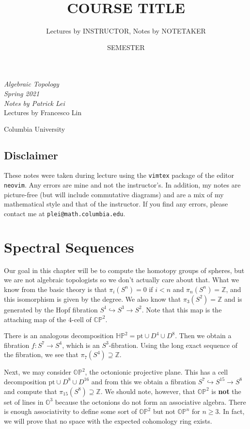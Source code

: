 \documentclass[leqno, openany]{memoir}
\title{COURSE TITLE}
\author{Lectures by INSTRUCTOR, Notes by NOTETAKER}
\date{SEMESTER}
\theoremstyle{definition}
\theoremstyle{remark}
\theoremstyle{plain}
\theoremstyle{definition}
\theoremstyle{remark}
\renewcommand{\H}{\mathbb{H}}
\newcommand{\C}{\mathbb{C}}
\newcommand{\Z}{\mathbb{Z}}
\renewcommand{\P}{\mathbb{P}}
\newcommand{\mr}[1]{\mathrm{#1}}
\newcommand*{\titleSW}
    {\begingroup%
    \raggedleft
    \vspace*{\baselineskip}
    {\Huge\itshape Algebraic Topology \\ Spring 2021}\\[\baselineskip]
    {\large\itshape Notes by Patrick Lei}\\[0.2\textheight]
    {\Large Lectures by Francesco Lin}\par
    \vfill
    {\Large \sffamily Columbia University}
    \vspace*{\baselineskip}
\endgroup}
\begin{document}
    
\begin{titlingpage}
\titleSW
\end{titlingpage}

\thispagestyle{empty}
\section*{Disclaimer}%
\label{sec:disclaimer}

These notes were taken during lecture using the \texttt{vimtex} package of the editor \texttt{neovim}. 
Any errors are mine and not the instructor's. 
In addition, my notes are picture-free (but will include commutative diagrams) and are a mix of my mathematical style and that of the instructor.
If you find any errors, please contact me at \texttt{plei@math.columbia.edu}.
\newpage


\tableofcontents

\chapter{Spectral Sequences}%
\label{cha:spectral_sequences}

Our goal in this chapter will be to compute the homotopy groups of spheres, but we are not algebraic topologists so we don't actually care about that. What we know from the basic theory is that $\pi_i(S^n) = 0$ if $i < n$ and $\pi_n(S^n) = \Z$, and this isomorphism is given by the degree. We also know that $\pi_3(S^2) = \Z$ and is generated by the Hopf fibration $S^1 \hookrightarrow S^3 \to S^2$. Note that this map is the attaching map of the $4$-cell of $\C\P^2$.

There is an analogous decomposition $\H\P^2 = \mr{pt} \cup D^4 \cup D^8$. Then we obtain a fibration $f \colon S^7 \to S^4$, which is an $S^3$-fibration. Using the long exact sequence of the fibration, we see that $\pi_7(S^4) \supseteq \Z$.

Next, we may consider $\mathbb{O}\P^2$, the octonionic projective plane. This has a cell decomposition $\mr{pt} \cup D^8 \cup D^{16}$ and from this we obtain a fibration $S^7 \hookrightarrow S^{15} \to S^8$ and compute that $\pi_{15}(S^8) \supseteq \Z$. We should note, however, that $\mathbb{O}\P^2$ is \textbf{not} the set of lines in $\mathbb{O}^3$ because the octonions do not form an associative algebra. There is enough associativity to define some sort of $\mathbb{O}\P^2$ but not $\mathbb{O}\P^n$ for $n \geq 3$. In fact, we will prove that no space with the expected cohomology ring exists.
\end{document}
